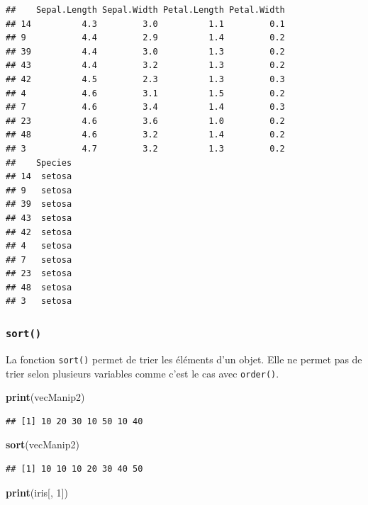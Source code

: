 \documentclass[twoside,symmetric]{book}
\newenvironment{Shaded}{}{}
\newcommand{\DecValTok}[1]{#1}
\newcommand{\KeywordTok}[1]{\textbf{#1}}
\newcommand{\NormalTok}[1]{#1}
\begin{document}
\begin{verbatim}
##    Sepal.Length Sepal.Width Petal.Length Petal.Width
## 14          4.3         3.0          1.1         0.1
## 9           4.4         2.9          1.4         0.2
## 39          4.4         3.0          1.3         0.2
## 43          4.4         3.2          1.3         0.2
## 42          4.5         2.3          1.3         0.3
## 4           4.6         3.1          1.5         0.2
## 7           4.6         3.4          1.4         0.3
## 23          4.6         3.6          1.0         0.2
## 48          4.6         3.2          1.4         0.2
## 3           4.7         3.2          1.3         0.2
##    Species
## 14  setosa
## 9   setosa
## 39  setosa
## 43  setosa
## 42  setosa
## 4   setosa
## 7   setosa
## 23  setosa
## 48  setosa
## 3   setosa
\end{verbatim}

\hypertarget{l015sort}{%
\subsubsection{\texorpdfstring{\texttt{sort()}}{sort()}}\label{l015sort}}

La fonction \texttt{sort()} permet de trier les éléments d'un objet. Elle ne permet pas de trier selon plusieurs variables comme c'est le cas avec \texttt{order()}.

\begin{Shaded}
\begin{Highlighting}[]
\KeywordTok{print}\NormalTok{(vecManip2)}
\end{Highlighting}
\end{Shaded}

\begin{verbatim}
## [1] 10 20 30 10 50 10 40
\end{verbatim}

\begin{Shaded}
\begin{Highlighting}[]
\KeywordTok{sort}\NormalTok{(vecManip2)}
\end{Highlighting}
\end{Shaded}

\begin{verbatim}
## [1] 10 10 10 20 30 40 50
\end{verbatim}

\begin{Shaded}
\begin{Highlighting}[]
\KeywordTok{print}\NormalTok{(iris[, }\DecValTok{1}\NormalTok{])}
\end{Highlighting}
\end{Shaded}
\end{document}
